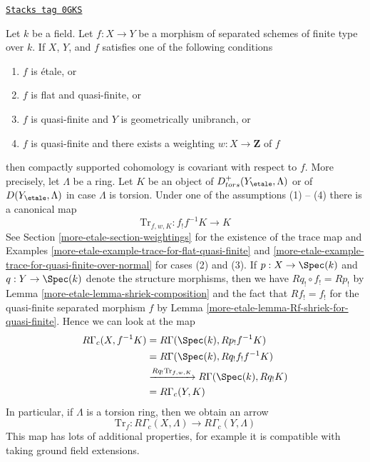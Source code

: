 \begin{remark}

\label{more-etale-remark-covariance-compactly-supported}
\href{https://stacks.math.columbia.edu/tag/0GKS}{\texttt{Stacks tag 0GKS}}

Let $k$ be a field. Let $f : X \to Y$ be a morphism of separated
schemes of finite type over $k$. If $X$, $Y$, and $f$ satisfies one
of the following conditions
\begin{enumerate}
\item $f$ is \'etale, or
\item $f$ is flat and quasi-finite, or
\item $f$ is quasi-finite and $Y$ is geometrically unibranch, or
\item $f$ is quasi-finite and there exists a weighting
$w : X \to \mathbf{Z}$ of $f$
\end{enumerate}
then compactly supported cohomology is covariant with respect to $f$.
More precisely, let $\Lambda$ be a ring. Let $K$ be an object of
$D^+_{tors}(Y_\etale, \Lambda)$ or of $D(Y_\etale, \Lambda)$ in case
$\Lambda$ is torsion. Under one of the assumptions (1) -- (4)
there is a canonical map
$$
\text{Tr}_{f, w, K} : f_!f^{-1}K \longrightarrow K
$$
See Section \ref{more-etale-section-weightings} for the existence of the
trace map and Examples \ref{more-etale-example-trace-for-flat-quasi-finite} and
\ref{more-etale-example-trace-for-quasi-finite-over-normal} for cases (2) and (3).
If $p : X \to \Spec(k)$ and $q : Y \to \Spec(k)$ denote
the structure morphisms, then we have $Rq_! \circ f_! = Rp_!$
by Lemma \ref{more-etale-lemma-shriek-composition} and the fact that
$Rf_! = f_!$ for the quasi-finite separated morphism $f$ by
Lemma \ref{more-etale-lemma-Rf-shriek-for-quasi-finite}. Hence we can look
at the map
\begin{align*}
R\Gamma_c(X, f^{-1}K)
& =
R\Gamma(\Spec(k), Rp_!f^{-1}K) \\
& =
R\Gamma(\Spec(k), Rq_!f_!f^{-1}K) \\
& \xrightarrow{Rq_!\text{Tr}_{f, w, K}}
R\Gamma(\Spec(k), Rq_!K) \\
& =
R\Gamma_c(Y, K)
\end{align*}
In particular, if $\Lambda$ is a torsion ring, then we obtain an arrow
$$
\text{Tr}_f : R\Gamma_c(X, \Lambda) \longrightarrow R\Gamma_c(Y, \Lambda)
$$
This map has lots of additional properties, for example it is
compatible with taking ground field extensions.
\end{remark}

